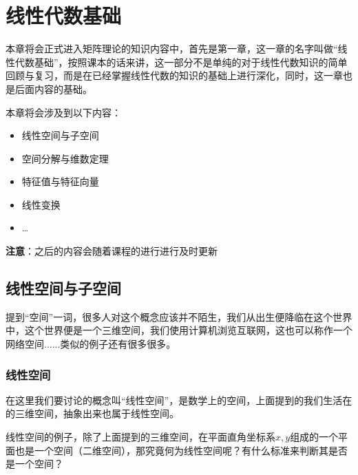 \documentclass[12pt, a4paper, oneside, UTF8]{ctexbook}
\begin{document}
\else
\fi
\chapter{线性代数基础}
本章将会正式进入矩阵理论的知识内容中，首先是第一章，这一章的名字叫做“线性代数基础”，按照课本的话来讲，这一部分不是单纯的对于线性代数知识的简单回顾与复习，而是在已经掌握线性代数的知识的基础上进行深化，同时，这一章也是后面内容的基础。

本章将会涉及到以下内容：
\begin{itemize}[leftmargin=4em]
    \item 线性空间与子空间
    \item 空间分解与维数定理
    \item 特征值与特征向量
    \item 线性变换
    \item \dots
\end{itemize}
\noindent
\textbf{注意}：之后的内容会随着课程的进行进行及时更新
\newpage
\section{线性空间与子空间}
提到“空间”一词，很多人对这个概念应该并不陌生，我们从出生便降临在这个世界中，这个世界便是一个三维空间，我们使用计算机浏览互联网，这也可以称作一个网络空间......类似的例子还有很多很多。

\subsection{线性空间}
在这里我们要讨论的概念叫“线性空间”，是数学上的空间，上面提到的我们生活在的三维空间，抽象出来也属于线性空间。

线性空间的例子，除了上面提到的三维空间，在平面直角坐标系$x,y$组成的一个平面也是一个空间（二维空间），那究竟何为线性空间呢？有什么标准来判断其是否是一个空间？
\end{document}
